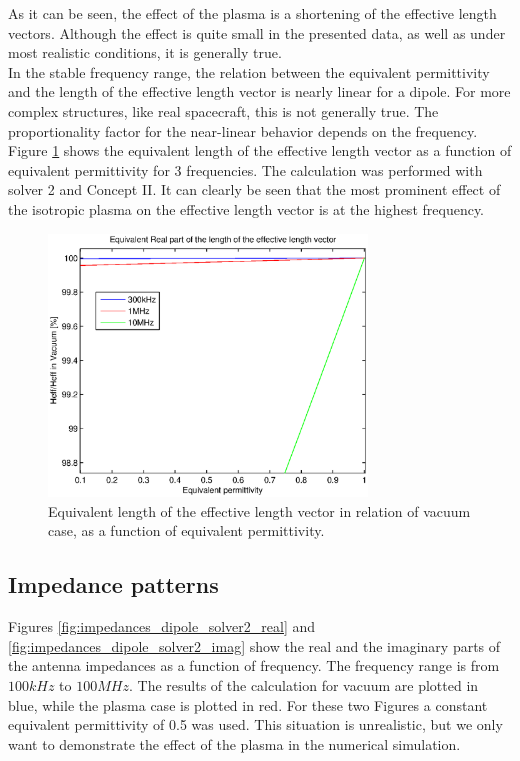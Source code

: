 \documentclass[draft,ras]{agutex}
\begin{document}
\begin{article}
As it can be seen, the effect of the plasma is a shortening of the effective length vectors. Although the effect is quite small in the presented data, as well as under most realistic conditions, it is generally true.\\

In the stable frequency range, the relation between the equivalent permittivity and the length of the effective length vector is nearly linear for a dipole. For more complex structures, like real spacecraft, this is not generally true. The proportionality factor for the near-linear behavior depends on the frequency. Figure \ref{fig:relative_heff_shortening} shows the equivalent length of the effective length vector as a function of equivalent permittivity for 3 frequencies. The calculation was performed with solver 2 and Concept II. It can clearly be seen that the most prominent effect of the isotropic plasma on the effective length vector is at the highest frequency.\\

\begin{figure}
  \noindent\includegraphics[width=20pc]{heff_shortening_dipole.eps}
\caption{Equivalent length of the effective length vector in relation of vacuum case, as a function of equivalent permittivity.}
\label{fig:relative_heff_shortening}
\end{figure}

\subsection{Impedance patterns}
Figures \ref{fig:impedances_dipole_solver2_real} and \ref{fig:impedances_dipole_solver2_imag} show the real and the imaginary parts of the antenna impedances as a function of frequency. The frequency range is from $100kHz$ to $100MHz$. The results of the calculation for vacuum are plotted in blue, while the plasma case is plotted in red. For these two Figures a constant equivalent permittivity of 0.5 was used. This situation is unrealistic, but we only want to demonstrate the effect of the plasma in the numerical simulation.\\


\end{article}
\end{document}
